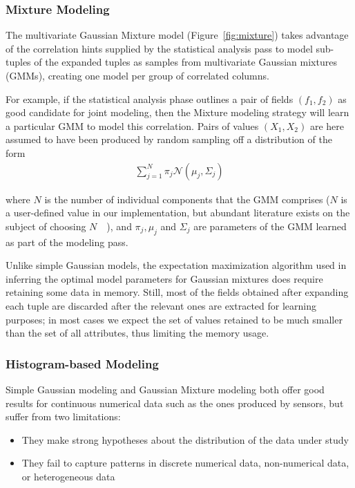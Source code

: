 \subsubsection{Mixture Modeling}
The multivariate Gaussian Mixture model (Figure~\ref{fig:mixture}) takes advantage of the correlation hints supplied by the statistical analysis pass to model sub-tuples of the expanded tuples as samples from multivariate Gaussian mixtures (GMMs), creating one model per group of correlated columns.

For example, if the statistical analysis phase outlines a pair of fields $(f_1, f_2)$ as good candidate for joint modeling, then the Mixture modeling strategy will learn a particular GMM to model this correlation. Pairs of values $(X_1, X_2)$ are here assumed to have been produced by random sampling off a distribution of the form
\begin{align*}
\sum_{j=1}^{N} \pi_j \mathcal N(\mu_j, \Sigma_j)
\end{align*}

where $N$ is the number of individual components that the GMM comprises ($N$ is a user-defined value in our implementation, but abundant literature exists on the subject of choosing $N$~\cite{Schwartz1978}~\cite{Akaike1974}), and $\pi_j, \mu_j$ and $\Sigma_j$ are parameters of the GMM learned as part of the modeling pass.

Unlike simple Gaussian models, the expectation maximization algorithm used in inferring the optimal model parameters for Gaussian mixtures does require retaining some data in memory. Still, most of the fields obtained after expanding each tuple are discarded after the relevant ones are extracted for learning purposes; in most cases we expect the set of values retained to be much smaller than the set of all attributes, thus limiting the memory usage.

\subsubsection{Histogram-based Modeling}
\label{sec:histograms}
Simple Gaussian modeling and Gaussian Mixture modeling both offer good results for continuous numerical data such as the ones produced by sensors, but suffer from two limitations:

\begin{itemize}
\item They make strong hypotheses about the distribution of the data under study
\item They fail to capture patterns in discrete numerical data, non-numerical data, or heterogeneous data
\end{itemize}

